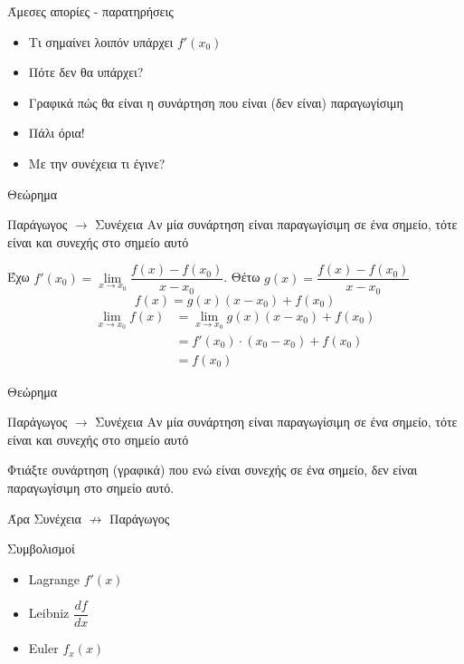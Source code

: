 \documentclass{presentation}
\begin{document}
\begin{frame}{Άμεσες απορίες - παρατηρήσεις}
  \begin{itemize}
    \item<1-> Τι σημαίνει λοιπόν υπάρχει $f'(x_0)$
    \item<2-> Πότε δεν θα υπάρχει?
    \item<3-> Γραφικά πώς θα είναι η συνάρτηση που είναι (δεν είναι) παραγωγίσιμη
    \item<4-> Πάλι όρια!
    \item<5-> Με την συνέχεια τι έγινε?
  \end{itemize}
\end{frame}

\begin{frame}{Θεώρημα}
  \begin{block}{Παράγωγος $\to$ Συνέχεια}
    Αν μία συνάρτηση είναι παραγωγίσιμη σε ένα σημείο, τότε είναι και συνεχής στο σημείο αυτό
  \end{block}
  Έχω $f'(x_0)=\lim\limits_{x \to x_0}{ \dfrac{f(x)-f(x_0)}{x-x_0} }$. Θέτω $g(x)=\dfrac{f(x)-f(x_0)}{x-x_0}$
  $$f(x)=g(x)(x-x_0)+f(x_0)$$
  \begin{align*}
    \lim\limits_{x \to x_0}{ f(x) } & =\lim\limits_{x \to x_0}{ g(x)(x-x_0)+f(x_0) } \\
                                    & =f'(x_0)\cdot (x_0-x_0)+f(x_0)                 \\
                                    & =f(x_0)
  \end{align*}
\end{frame}

\begin{frame}{Θεώρημα}
  \begin{block}{Παράγωγος $\to$ Συνέχεια}
    Αν μία συνάρτηση είναι παραγωγίσιμη σε ένα σημείο, τότε είναι και συνεχής στο σημείο αυτό
  \end{block}
   Φτιάξτε συνάρτηση (γραφικά) που ενώ είναι συνεχής σε ένα σημείο, δεν είναι παραγωγίσιμη στο σημείο αυτό.

   Άρα Συνέχεια $\nrightarrow$ Παράγωγος
\end{frame}

\begin{frame}{Συμβολισμοί}
  \begin{itemize}
    \item<1-> Lagrange $f'(x)$
    \item<2-> Leibniz $\dfrac{df}{dx}$
    \item<3-> Euler $f_x(x)$
  \end{itemize}
\end{frame}
\end{document}
